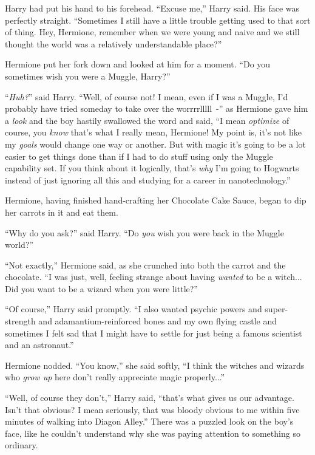 Harry had put his hand to his forehead. ``Excuse me,'' Harry said. His face was perfectly straight. ``Sometimes I still have a little trouble getting used to that sort of thing. Hey, Hermione, remember when we were young and naive and we still thought the world was a relatively understandable place?''

Hermione put her fork down and looked at him for a moment. ``Do you sometimes wish you were a Muggle, Harry?''

``\emph{Huh?}'' said Harry. ``Well, of course not! I mean, even if I was a Muggle, I'd probably have tried someday to take over the worrrrlllll~-'' as Hermione gave him a \emph{look} and the boy hastily swallowed the word and said, ``I mean \emph{optimize} of course, you \emph{know} that's what I really mean, Hermione! My point is, it's not like my \emph{goals} would change one way or another. But with magic it's going to be a lot easier to get things done than if I had to do stuff using only the Muggle capability set. If you think about it logically, that's \emph{why} I'm going to Hogwarts instead of just ignoring all this and studying for a career in nanotechnology.''

Hermione, having finished hand-crafting her Chocolate Cake Sauce, began to dip her carrots in it and eat them.

``Why do you ask?'' said Harry. ``Do \emph{you} wish you were back in the Muggle world?''

``Not exactly,'' Hermione said, as she crunched into both the carrot and the chocolate. ``I was just, well, feeling strange about having \emph{wanted} to be a witch... Did you want to be a wizard when you were little?''

``Of course,'' Harry said promptly. ``I also wanted psychic powers and super-strength and adamantium-reinforced bones and my own flying castle and sometimes I felt sad that I might have to settle for just being a famous scientist and an astronaut.''

Hermione nodded. ``You know,'' she said softly, ``I think the witches and wizards who \emph{grow up} here don't really appreciate magic properly...''

``Well, of course they don't,'' Harry said, ``that's what gives us our advantage. Isn't that obvious? I mean seriously, that was bloody obvious to me within five minutes of walking into Diagon Alley.'' There was a puzzled look on the boy's face, like he couldn't understand why she was paying attention to something so ordinary.
